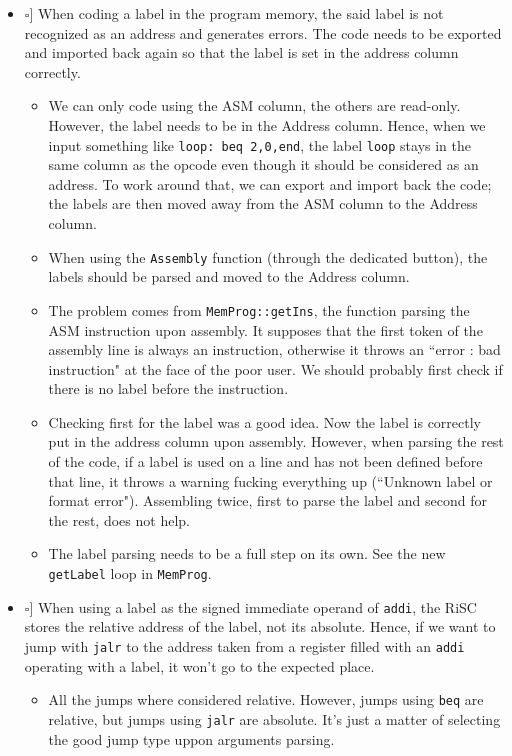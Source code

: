 \documentclass[12pt,a4paper]{extarticle}
\newcommand{\done}{\makebox[0pt][l]{$\square$}\raisebox{.15ex}{\hspace{0.1em}$\checkmark$}}%
\begin{document}
\begin{itemize}
  \item[\done] When coding a label in the program memory, the said label is not recognized as an address and generates errors.
  The code needs to be exported and imported back again so that the label is set in the address column correctly.
  \begin{itemize}
    \item We can only code using the ASM column, the others are read-only.
    However, the label needs to be in the Address column.
    Hence, when we input something like \texttt{loop: beq 2,0,end}, the label \texttt{loop} stays in the same column as the opcode even though it should be considered as an address.
    To work around that, we can export and import back the code; the labels are then moved away from the ASM column to the Address column.
    \item When using the \texttt{Assembly} function (through the dedicated button), the labels should be parsed and moved to the Address column.
    \item The problem comes from \texttt{MemProg::getIns}, the function parsing the ASM instruction upon assembly.
    It supposes that the first token of the assembly line is always an instruction, otherwise it throws an ``error : bad instruction" at the face of the poor user.
    We should probably first check if there is no label before the instruction.
    \item Checking first for the label was a good idea.
    Now the label is correctly put in the address column upon assembly.
    However, when parsing the rest of the code, if a label is used on a line and has not been defined before that line, it throws a warning fucking everything up (``Unknown label or format error").
    Assembling twice, first to parse the label and second for the rest, does not help.
    \item The label parsing needs to be a full step on its own.
    See the new \texttt{getLabel} loop in \texttt{MemProg}.
  \end{itemize}

  \item[\done] When using a label as the signed immediate operand of \texttt{addi}, the RiSC stores the relative address of the label, not its absolute.
  Hence, if we want to jump with \texttt{jalr} to the address taken from a register filled with an \texttt{addi} operating with a label, it won't go to the expected place.
  \begin{itemize}
    \item All the jumps where considered relative.
    However, jumps using \texttt{beq} are relative, but jumps using \texttt{jalr} are absolute.
    It's just a matter of selecting the good jump type uppon arguments parsing.
  \end{itemize}


\end{itemize}
\end{document}
